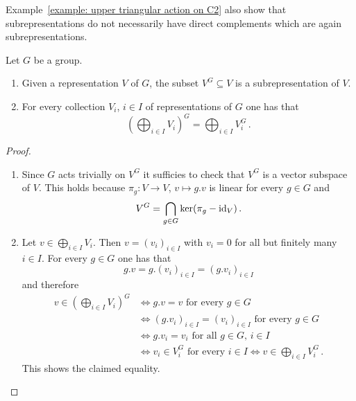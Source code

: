 \begin{warning}
  Example~\ref{example: upper triangular action on C2} also show that subrepresentations do not necessarily have direct complements which are again subrepresentations.
\end{warning}


\begin{lemma}\label{lemma: direct sum and invariants commute}
  Let $G$ be a group.
  \begin{enumerate}
    \item
      Given a representation $V$ of $G$, the subset $V^G \subseteq V$ is a subrepresentation of $V$.
    \item
      For every collection $V_i$, $i \in I$ of representations of $G$ one has that
      \[
          \left(
            \bigoplus_{i \in I} V_i
          \right)^G
        = \bigoplus_{i \in I} V_i^G \,.
      \]
  \end{enumerate}
\end{lemma}
\begin{proof}
  \leavevmode
  \begin{enumerate}
    \item
      Since $G$ acts trivially on $V^G$ it sufficies to check that $V^G$ is a vector subspace of $V$.
      This holds because $\pi_g \colon V \to V$, $v \mapsto g.v$ is linear for every $g \in G$ and
      \[
          V^G
        = \bigcap_{g \in G} \ker(\pi_g - \operatorname{id}_V) \,.
      \]
    \item
      Let $v \in \bigoplus_{i \in I} V_i$.
      Then $v = (v_i)_{i \in I}$ with $v_i = 0$ for all but finitely many $i \in I$.
      For every $g \in G$ one has that
      \[
          g.v
        = g.(v_i)_{i \in I}
        = (g.v_i)_{i \in I}
      \]
      and therefore
      \begin{align*}
              v \in \left( \bigoplus_{i \in I} V_i \right)^G
        &\iff \text{$g.v = v$ for every $g \in G$}  \\
        &\iff \text{$(g.v_i)_{i \in I} = (v_i)_{i \in I}$ for every $g \in G$} \\
        &\iff \text{$g.v_i = v_i$ for all $g \in G$, $i \in I$} \\
        &\iff \text{$v_i \in V_i^G$ for every $i \in I$}
         \iff v \in \bigoplus_{i \in I} V_i^G \,.
      \end{align*}
      This shows the claimed equality.
  \qedhere
  \end{enumerate}
\end{proof}




